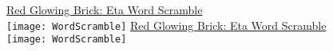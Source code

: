 \documentclass[white]{GL2020}
\begin{document}
\name{\wWordScrambleEta{}}

\vspace*{0.5cm}
\begin{center}
{\LARGE \underline{Red Glowing Brick: Eta Word Scramble}}\\
\vspace{0.5cm}
\texttt{[image: WordScramble]}
\vfill
{\LARGE \underline{Red Glowing Brick: Eta Word Scramble}}\\
\vspace{0.5cm}
\texttt{[image: WordScramble]}
\end{center}
\end{document}
